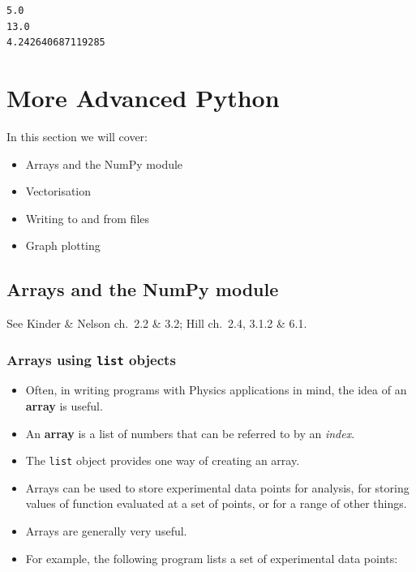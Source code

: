 \documentclass[10pt]{article}
\providecommand{\tightlist}{%
      \setlength{\itemsep}{0pt}\setlength{\parskip}{0pt}}
\begin{document}
    \begin{Verbatim}[commandchars=\\\{\}]
5.0
13.0
4.242640687119285
    \end{Verbatim}

    \hypertarget{more-advanced-python}{%
\section{More Advanced Python}\label{more-advanced-python}}

In this section we will cover: \begin{itemize}\tightlist
\item Arrays and the NumPy module \item
Vectorisation \item Writing to and from files \item Graph plotting

\end{itemize}

\hypertarget{arrays-and-the-numpy-module}{%
\subsection{Arrays and the NumPy
module}\label{arrays-and-the-numpy-module}}

See Kinder \& Nelson ch.~2.2 \& 3.2; Hill ch.~2.4, 3.1.2 \& 6.1. 

\subsubsection{Arrays using \texttt{list} objects}
\begin{itemize}
\tightlist
\item Often, in writing programs
with Physics applications in mind, the idea of an \textbf{array} is
useful. 
\item An \textbf{array} is a list of numbers that can be referred to
by an \emph{index}. 
\item The \texttt{list} object provides one way of
creating an array. 
\item Arrays can be used to store experimental data
points for analysis, for storing values of function evaluated at a set
of points, or for a range of other things. 
\item Arrays are generally very
useful. 
\item For example, the following program lists a set of experimental
data points:

\end{itemize}
\end{document}
